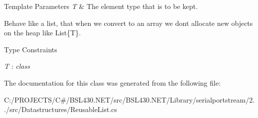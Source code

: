 \begin{DoxyTemplParams}{Template Parameters}
{\em T} & The element type that is to be kept.\\
\hline
\end{DoxyTemplParams}


Behave like a list, that when we convert to an array we don\textquotesingle{}t allocate new objects on the heap like List\{T\}. \begin{Desc}
\item[Type Constraints]\begin{description}
\item[{\em T} : {\em class}]\end{description}
\end{Desc}


The documentation for this class was generated from the following file\+:\begin{DoxyCompactItemize}
\item 
C\+:/\+P\+R\+O\+J\+E\+C\+T\+S/\+C\#/\+B\+S\+L430.\+N\+E\+T/src/\+B\+S\+L430.\+N\+E\+T/\+Library/serialportstream/2../src/\+Datastructures/Reusable\+List.\+cs\end{DoxyCompactItemize}
